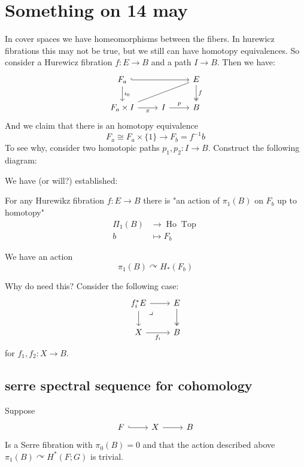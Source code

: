 \documentclass{article}
\DeclareMathOperator{\Ho}{Ho}
\DeclareMathOperator{\Top}{Top}
\begin{document}
\section{Something on 14 may}
In cover spaces we have homeomorphisms between the fibers. In hurewicz fibrations this may not be true, but we still can have homotopy equivalences. So consider a Hurewicz fibration $f:E\to B$ and a path $I\to B$. Then we have:
\[\begin{tikzcd}
	F_a\arrow[d,"i_0"]\arrow[rr,hook]&&E\arrow[d,two heads,"f"]\\
	F_a\times I\arrow[r,"\pi",swap]\arrow[urr,dash]&I\arrow[r,"p"]&B
\end{tikzcd}\]
And we claim that there is an homotopy equivalence
\[F_a\cong F_a\times\{1\}\to F_b=f^{-1}b\]
To see why, consider two homotopic paths $p_1,p_2:I\to B$. Construct the following diagram:

We have (or will?) established:
\begin{prop}
	For any Hurewikz fibration $f:E\to B$ there is "an action of $\pi_1(B)$ on $F_b$ up to homotopy"
	\begin{align*}
		\Pi_1(B)&\to \Ho\Top\\
		b&\mapsto F_b
	\end{align*}
\end{prop}
We have an action
\[\pi_1(B)\curvearrowright H_*(F_b)\]

Why do need this? Consider the following case:
\[\begin{tikzcd}
	f_i^*E\arrow[r]\arrow[dr,phantom,"\lrcorner",very near start]\arrow[d]&E\arrow[d,two heads]\\
	X\arrow[r,swap,"f_i"]&B
\end{tikzcd}\]
for $f_1,f_2:X\to B$.

\subsection{serre spectral sequence for cohomology}
Suppose
\[\begin{tikzcd}
	F\arrow[r,hook]&X\arrow[r]&B
\end{tikzcd}\]
Is a Serre fibration with $\pi_0(B)=0$ and that the action described above $\pi_1(B)\curvearrowright H^*(F;G)$ is trivial.
\end{document}

